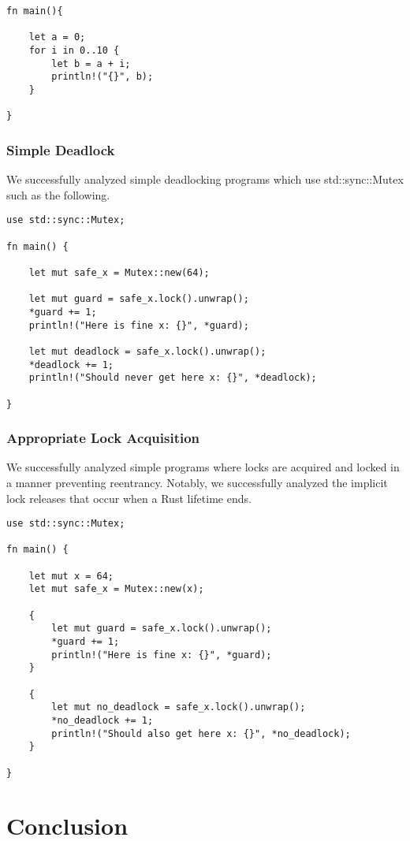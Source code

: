 \documentclass[conference]{IEEEtran}
\begin{document}
\begin{verbatim}
fn main(){

    let a = 0;
    for i in 0..10 {
        let b = a + i;
        println!("{}", b);
    }
    
}
\end{verbatim}

\subsubsection{Simple Deadlock}
We successfully analyzed simple deadlocking programs which use std::sync::Mutex such as the following.

\begin{verbatim}
use std::sync::Mutex;

fn main() {

    let mut safe_x = Mutex::new(64);
    
    let mut guard = safe_x.lock().unwrap();
    *guard += 1;
    println!("Here is fine x: {}", *guard);

    let mut deadlock = safe_x.lock().unwrap();
    *deadlock += 1;
    println!("Should never get here x: {}", *deadlock);

}
\end{verbatim}

\subsubsection{Appropriate Lock Acquisition}
We successfully analyzed simple programs where locks are acquired and locked in a manner preventing reentrancy. Notably, we successfully analyzed the implicit lock releases that occur when a Rust lifetime ends.

\begin{verbatim}
use std::sync::Mutex;

fn main() {

    let mut x = 64;
    let mut safe_x = Mutex::new(x);
    
    {
        let mut guard = safe_x.lock().unwrap();
        *guard += 1;
        println!("Here is fine x: {}", *guard);
    }

    {
        let mut no_deadlock = safe_x.lock().unwrap();
        *no_deadlock += 1;
        println!("Should also get here x: {}", *no_deadlock);
    }

}
\end{verbatim}

\section{Conclusion}

\begin{thebibliography}{00}

\end{thebibliography}
\end{document}
